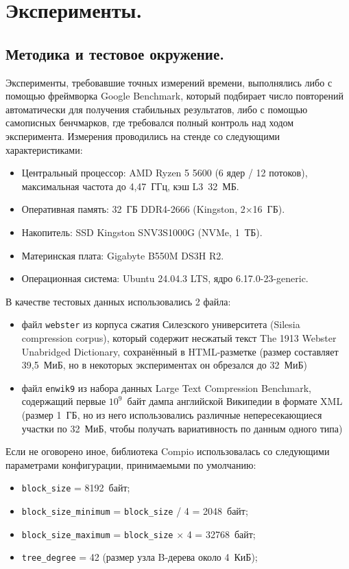 \section{Эксперименты.} \label{experiments}

\subsection{Методика и тестовое окружение.} \label{test-environment}

Эксперименты, требовавшие точных измерений времени, выполнялись либо с помощью фреймворка Google Benchmark\cite{google_benchmark}, который подбирает число повторений автоматически для получения стабильных результатов, либо с помощью самописных бенчмарков, где требовался полный контроль над ходом эксперимента. Измерения проводились на стенде со следующими характеристиками:

\begin{itemize}
    \item Центральный процессор: AMD Ryzen 5 5600 (6 ядер / 12 потоков), максимальная частота до 4,47~ГГц, кэш L3~32~МБ.
    \item Оперативная память: 32~ГБ DDR4-2666 (Kingston, 2×16~ГБ).
    \item Накопитель: SSD Kingston SNV3S1000G (NVMe, 1~ТБ).
    \item Материнская плата: Gigabyte B550M DS3H R2.
    \item Операционная система: Ubuntu 24.04.3 LTS, ядро 6.17.0-23-generic.
\end{itemize}

В качестве тестовых данных использовались 2 файла:
\begin{itemize}
    \item файл \texttt{webster} из корпуса сжатия Силезского университета (Silesia compression corpus)\cite{silesia_corpus}, который содержит несжатый текст The 1913 Webster Unabridged Dictionary, сохранённый в HTML-разметке (размер составляет 39,5~МиБ, но в некоторых экспериментах он обрезался до 32~МиБ)
    \item файл \texttt{enwik9} из набора данных Large Text Compression Benchmark\cite{ltcb}, содержащий первые $10^9$~байт дампа английской Википедии в формате XML (размер 1~ГБ, но из него использовались различные непересекающиеся участки по 32~МиБ, чтобы получать вариативность по данным одного типа)
\end{itemize}

Если не оговорено иное, библиотека Compio использовалась со следующими параметрами конфигурации, принимаемыми по умолчанию:
\begin{itemize}
    \item \texttt{block\_size} = 8192~байт;
    \item \texttt{block\_size\_minimum} = \texttt{block\_size} / 4 = 2048~байт;
    \item \texttt{block\_size\_maximum} = \texttt{block\_size} $\times$ 4 = 32768~байт;
    \item \texttt{tree\_degree} = 42 (размер узла B-дерева около 4~КиБ);
\end{itemize}

